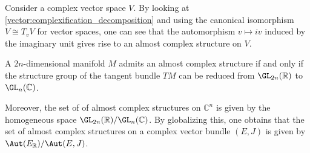     \begin{example}
        Consider a complex vector space $V$. By looking at \cref{vector:complexification_decomposition} and using the canonical isomorphism $V\cong T_vV$ for vector spaces, one can see that the automorphism $v\mapsto iv$ induced by the imaginary unit gives rise to an almost complex structure on $V$.
    \end{example}

    \begin{property}
        A $2n$-dimensional manifold $M$ admits an almost complex structure if and only if the structure group of the tangent bundle $TM$ can be reduced from $\GL_{2n}(\mathbb{R})$ to $\GL_n(\mathbb{C})$.

        Moreover, the set of of almost complex structures on $\mathbb{C}^n$ is given by the homogeneous space $\GL_{2n}(\mathbb{R})/\GL_n(\mathbb{C})$. By globalizing this, one obtains that the set of almost complex structures on a complex vector bundle $(E,J)$ is given by $\Aut(E_{\mathbb{R}})/\Aut(E,J)$.
    \end{property}


